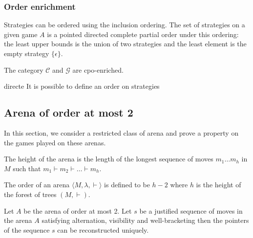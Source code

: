\subsubsection{Order enrichment}

Strategies can be ordered using the inclusion ordering.
The set of strategies on a given game $A$ is a pointed directed complete partial order under this ordering: the
least upper bounds is the union of two strategies and the least element is the empty strategy $\{ \epsilon \}$.

The category  $\mathcal{C}$ and  $\mathcal{G}$ are cpo-enriched.





directe It is possible to define an order on strategies


\subsection{Arena of order at most 2}
In this section, we consider a restricted class of arena and prove a
property on the games played on these arenas.

The height of the arena is the length of the longest sequence of moves
$m_1 \ldots m_h$ in $M$ such that $m_1 \vdash m_2 \vdash \ldots \vdash m_h$.

The order of an arena $\langle M, \lambda, \vdash \rangle$ is defined to be
$h-2$ where $h$ is the height of the forest of trees $(M, \vdash)$.


\begin{lem}
Let $A$ be the arena of order at most 2. Let $s$ be a justified sequence of moves in the arena $A$ satisfying
 alternation, visibility and well-bracketing then
the pointers of the sequence $s$ can be reconstructed uniquely.
\end{lem}



